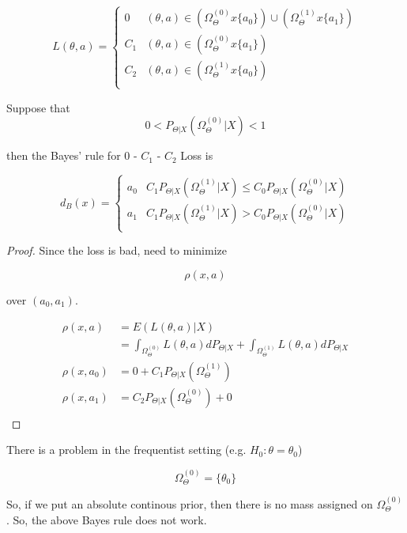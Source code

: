 \documentclass[11pt,fleqn]{book} %
\begin{document}
	$$L(\theta, a) = \left\{ \begin{array}{ll}	
		0 & 	(\theta, a) \in (\Omega_\Theta^{(0)} x \{ a_0\}) \cup (\Omega_\Theta^{(1)} x \{a_1\})\\
		C_1 & (\theta, a) \in (\Omega_\Theta^{(0)} x \{ a_1\}) \\
		C_2 & (\theta, a) \in (\Omega_\Theta^{(1)} x \{a_0\})\\
	\end{array}	\right. $$

	\begin{theorem}
		Suppose that 
				$$0 < P_{\Theta| X} (\Omega_\Theta^{(0)} | X) < 1 $$

		then the Bayes' rule for 0 - $C_1$ - $C_2$ Loss is 

				$$d_B(x) = \left\{ \begin{array}{ll}
					a_0 & C_1 P_{\Theta|X} (\Omega_\Theta^{(1)} | X) \leq C_0 P_{\Theta|X} (\Omega_\Theta^{(0)} | X)\\
					a_1 & C_1 P_{\Theta|X} (\Omega_\Theta^{(1)} | X) > C_0 P_{\Theta|X} (\Omega_\Theta^{(0)} | X)\\
				\end{array} \right. $$
	\end{theorem}

	\begin{proof}
		Since the loss is bad, need to minimize 

				$$\rho(x, a)$$

	 over $(a_0, a_1)$. 

	 	\begin{align*}
	 		\rho(x, a) &= E(L(\theta, a) | X)\\
	 			&= \int_{\Omega_\Theta^{(0)}} L(\theta, a) dP_{\Theta|X} + \int_{\Omega_\Theta^{(1)}} L(\theta, a) dP_{\Theta|X}\\
	 		\rho(x, a_0) &= 0 + C_1 P_{\Theta|X} (\Omega_\Theta^{(1)})\\
	 		\rho(x, a_1) &=  C_2 P_{\Theta|X} (\Omega_\Theta^{(0)}) + 0\\
	 	\end{align*}


	\end{proof}

There is a problem in the frequentist setting (e.g. $H_0: \theta = \theta_0$)

		$$\Omega_\Theta^{(0)} = \{\theta_0 \} $$

So, if we put an absolute continous prior, then there is no mass assigned on $\Omega_\Theta^{(0)}$. So, the above Bayes rule does not work. 
\end{document}
